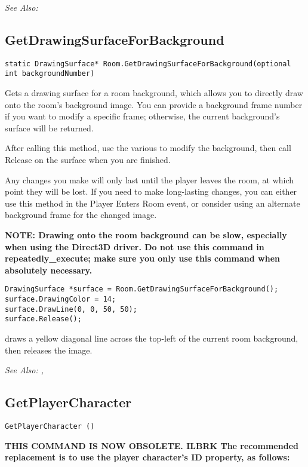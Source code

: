 \it{See Also:} 


\subsection{GetDrawingSurfaceForBackground}\label{Room.GetDrawingSurfaceForBackground}%

\begin{verbatim}
static DrawingSurface* Room.GetDrawingSurfaceForBackground(optional int backgroundNumber)
\end{verbatim}
Gets a drawing surface for a room background, which allows you to directly draw
onto the room's background image. You can provide a background frame number if you
want to modify a specific frame; otherwise, the current background's surface will be returned.

After calling this method, use the various  to modify the
background, then call Release on the surface when you are finished.

Any changes you make will only last until the player leaves the room, at
which point they will be lost. If you need to make long-lasting changes, you
can either use this method in the Player Enters Room event, or consider using
an alternate background frame for the changed image.

\bf{NOTE:} Drawing onto the room background can be slow, especially when using the Direct3D
driver. Do not use this command in repeatedly_execute; make sure you only use this command
when absolutely necessary.

\begin{verbatim}
DrawingSurface *surface = Room.GetDrawingSurfaceForBackground();
surface.DrawingColor = 14;
surface.DrawLine(0, 0, 50, 50);
surface.Release();
\end{verbatim}
draws a yellow diagonal line across the top-left of the current room background,
then releases the image.

\it{See Also:} ,


\subsection{GetPlayerCharacter}\label{GetPlayerCharacter}%

\begin{verbatim}
GetPlayerCharacter ()
\end{verbatim}
\bf{THIS COMMAND IS NOW OBSOLETE.} ILBRK
The recommended replacement is to use the player character's ID property, as follows:


